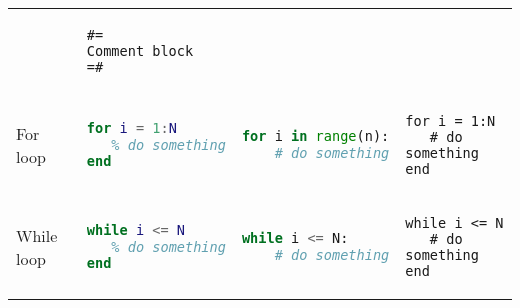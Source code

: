 \begin{tabular}[]{@{}llll@{}}
\begin{minipage}[t]{0.22\columnwidth}
\end{minipage} & \begin{minipage}[t]{0.25\columnwidth}\raggedright
\begin{lstlisting}
#=
Comment block
=#
\end{lstlisting}

\end{minipage}\tabularnewline
\begin{minipage}[t]{0.19\columnwidth}\raggedright
For loop
\end{minipage} & \begin{minipage}[t]{0.22\columnwidth}\raggedright
\begin{lstlisting}[language=Matlab]
for i = 1:N
   % do something
end
\end{lstlisting}

\end{minipage} & \begin{minipage}[t]{0.22\columnwidth}\raggedright
\begin{lstlisting}[language=Python]
for i in range(n):
    # do something
\end{lstlisting}

\end{minipage} & \begin{minipage}[t]{0.25\columnwidth}\raggedright
\begin{lstlisting}
for i = 1:N
   # do something
end
\end{lstlisting}

\end{minipage}\tabularnewline
\begin{minipage}[t]{0.19\columnwidth}\raggedright
While loop
\end{minipage} & \begin{minipage}[t]{0.22\columnwidth}\raggedright
\begin{lstlisting}[language=Matlab]
while i <= N
   % do something
end
\end{lstlisting}

\end{minipage} & \begin{minipage}[t]{0.22\columnwidth}\raggedright
\begin{lstlisting}[language=Python]
while i <= N:
    # do something
\end{lstlisting}

\end{minipage} & \begin{minipage}[t]{0.25\columnwidth}\raggedright
\begin{lstlisting}
while i <= N
   # do something
end
\end{lstlisting}


\end{minipage}
\end{tabular}
